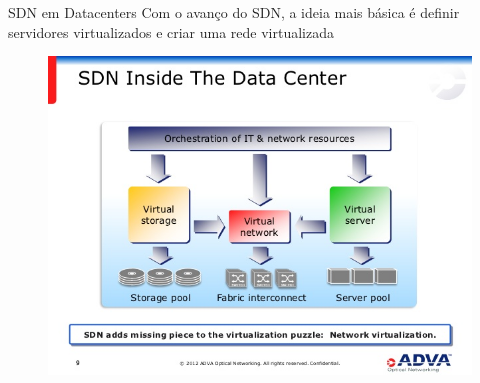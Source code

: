 \documentclass[aspectratio=169]{beamer}
\begin{document}
	\begin{frame} {SDN em Datacenters}
		Com o avanço do SDN, a ideia mais básica é definir servidores virtualizados e criar uma rede virtualizada
		\begin{figure}[ht]   
			\includegraphics[scale=0.35]{imagens/inside-sdn.jpg}
			\label{fig:sample_figure}
		\end{figure}
	\end{frame}
\end{document}
